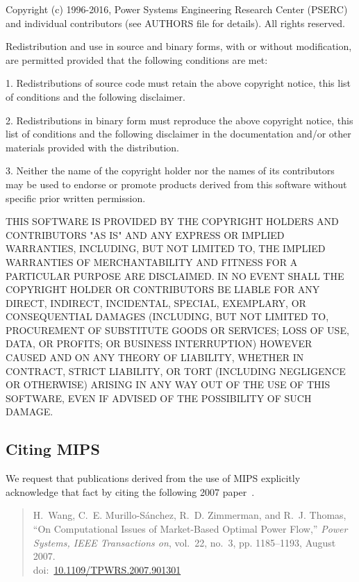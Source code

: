 \documentclass[12pt]{article}
\newcommand{\mips}[0]{{MIPS}}
\newcommand{\doi}[1]{doi:~\href{https://doi.org/#1}{#1}}
\numberwithin{equation}{section}
\numberwithin{table}{section}
\numberwithin{figure}{section}
\begin{document}
\begin{Notice}
Copyright (c) 1996-2016, Power Systems Engineering Research Center
(PSERC) and individual contributors (see AUTHORS file for details).
All rights reserved.

Redistribution and use in source and binary forms, with or without
modification, are permitted provided that the following conditions
are met:

1. Redistributions of source code must retain the above copyright
notice, this list of conditions and the following disclaimer.

2. Redistributions in binary form must reproduce the above copyright
notice, this list of conditions and the following disclaimer in the
documentation and/or other materials provided with the distribution.

3. Neither the name of the copyright holder nor the names of its
contributors may be used to endorse or promote products derived from
this software without specific prior written permission.

THIS SOFTWARE IS PROVIDED BY THE COPYRIGHT HOLDERS AND CONTRIBUTORS
"AS IS" AND ANY EXPRESS OR IMPLIED WARRANTIES, INCLUDING, BUT NOT
LIMITED TO, THE IMPLIED WARRANTIES OF MERCHANTABILITY AND FITNESS
FOR A PARTICULAR PURPOSE ARE DISCLAIMED. IN NO EVENT SHALL THE
COPYRIGHT HOLDER OR CONTRIBUTORS BE LIABLE FOR ANY DIRECT, INDIRECT,
INCIDENTAL, SPECIAL, EXEMPLARY, OR CONSEQUENTIAL DAMAGES (INCLUDING,
BUT NOT LIMITED TO, PROCUREMENT OF SUBSTITUTE GOODS OR SERVICES;
LOSS OF USE, DATA, OR PROFITS; OR BUSINESS INTERRUPTION) HOWEVER
CAUSED AND ON ANY THEORY OF LIABILITY, WHETHER IN CONTRACT, STRICT
LIABILITY, OR TORT (INCLUDING NEGLIGENCE OR OTHERWISE) ARISING IN
ANY WAY OUT OF THE USE OF THIS SOFTWARE, EVEN IF ADVISED OF THE
POSSIBILITY OF SUCH DAMAGE.
\end{Notice}

\subsection{Citing \mips{}}

We request that publications derived from the use of \mips{} explicitly acknowledge that fact by citing the following 2007 paper~\cite{wang2007a}.

\begin{quote}
\footnotesize
H.~Wang, C.~E. Murillo-S{\'a}nchez, R.~D. Zimmerman, and R.~J. Thomas, ``On
Computational Issues of Market-Based Optimal Power Flow,'' \emph{Power
Systems, IEEE Transactions on}, vol.~22, no.~3, pp. 1185--1193, August 2007.\\
\doi{10.1109/TPWRS.2007.901301}
\end{quote}
\end{document}
